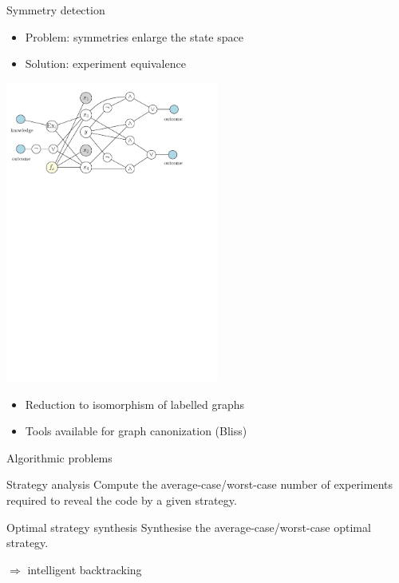 \documentclass{beamer}
\begin{document}
\begin{frame}{Symmetry detection}
\begin{itemize}
\item Problem: symmetries enlarge the state space
\item Solution: experiment equivalence
\end{itemize}
\pause
\centerline{\includegraphics[width=7cm]{../pictures/exp-graph-sim.pdf}}
\begin{itemize}
\item Reduction to isomorphism of labelled graphs
\item Tools available for graph canonization (Bliss)
\end{itemize}
\end{frame}

\begin{frame}{Algorithmic problems}
\begin{block}{Strategy analysis}
Compute the average-case/worst-case number of experiments required
  to reveal the code by a given strategy.
\end{block}
\bigskip
\begin{block}{Optimal strategy synthesis}
Synthesise the average-case/worst-case optimal strategy.
\end{block}\pause

\bigskip
\centerline{$\Longrightarrow$ intelligent backtracking}
\end{frame}
\end{document}
